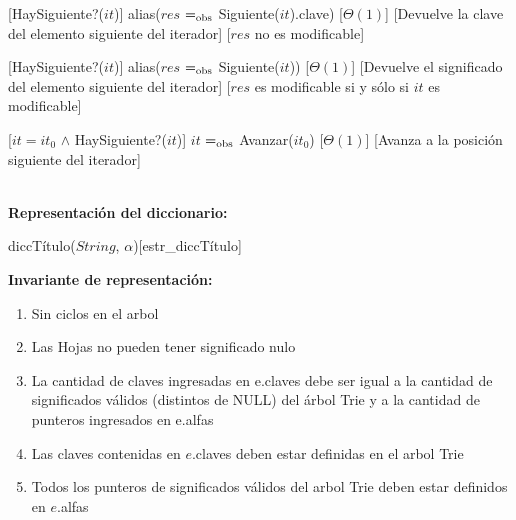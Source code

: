 \begin{Interfaz}
  [HaySiguiente?($it$)]
  {alias($res$ $=_{\mathrm{obs}}$ Siguiente($it$).clave)}
  [$\Theta(1)$]
  [Devuelve la clave del elemento siguiente del iterador]
  [$res$ no es modificable] %

  [HaySiguiente?($it$)]
  {alias($res$ $=_{\mathrm{obs}}$ Siguiente($it$))}
  [$\Theta(1)$]
  [Devuelve el significado del elemento siguiente del iterador]
  [$res$ es modificable si y sólo si $it$ es modificable]
  
  [$it = it_0$ $\land$ HaySiguiente?($it$)]
  {$it$ $=_{\mathrm{obs}}$ Avanzar($it_0$)}
  [$\Theta(1)$]
  [Avanza a la posición siguiente del iterador]
  
  
\end{Interfaz}

\begin{Representacion}\\
\tab\textbf{Representación del diccionario:}
  \begin{Estructura}{diccTítulo($String$, $\alpha$)}[estr\_diccTítulo]
    \begin{Tupla}
    \end{Tupla}
   
    \begin{Tupla}
    \end{Tupla}
  \end{Estructura}


 \textbf{Invariante de representación:}
 \begin{enumerate}
    \item Sin ciclos en el arbol
    \item Las Hojas no pueden tener significado nulo
    \item La cantidad de claves ingresadas en e.claves debe ser igual a la cantidad de significados válidos (distintos de NULL) del árbol Trie y a la cantidad de punteros ingresados en e.alfas
    \item Las claves contenidas en $e$.claves deben estar definidas en el arbol Trie
    \item Todos los punteros de significados válidos del arbol Trie deben estar definidos en $e$.alfas 
 \end{enumerate}

\end{Representacion}

